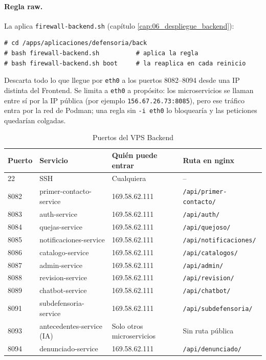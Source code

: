 
\paragraph{Regla raw.} La aplica \texttt{firewall-backend.sh} (capítulo \ref{cap:06_despliegue_backend}):
\begin{lstlisting}
# cd /apps/aplicaciones/defensoria/back
# bash firewall-backend.sh          # aplica la regla
# bash firewall-backend.sh boot     # la reaplica en cada reinicio
\end{lstlisting}
Descarta todo lo que llegue por \texttt{eth0} a los puertos 8082--8094 desde una IP distinta del Frontend. Se limita a \texttt{eth0} a propósito: los microservicios se llaman entre sí por la IP pública (por ejemplo \texttt{156.67.26.73:8085}), pero ese tráfico entra por la red de Podman; una regla sin \texttt{-i eth0} lo bloquearía y las peticiones quedarían colgadas.

\begin{table}[H]
\centering
\caption{Puertos del VPS Backend}
\small
\begin{tabular}{p{1.4cm}p{4.2cm}p{3.2cm}p{5.4cm}}
\toprule
\textbf{Puerto} & \textbf{Servicio} & \textbf{Quién puede entrar} & \textbf{Ruta en nginx} \\
\midrule
22 & SSH & Cualquiera & -- \\
8082 & primer-contacto-service & 169.58.62.111 & \texttt{/api/primer-contacto/} \\
8083 & auth-service & 169.58.62.111 & \texttt{/api/auth/} \\
8084 & quejas-service & 169.58.62.111 & \texttt{/api/quejoso/} \\
8085 & notificaciones-service & 169.58.62.111 & \texttt{/api/notificaciones/} \\
8086 & catalogo-service & 169.58.62.111 & \texttt{/api/catalogos/} \\
8087 & admin-service & 169.58.62.111 & \texttt{/api/admin/} \\
8088 & revision-service & 169.58.62.111 & \texttt{/api/revision/} \\
8089 & chatbot-service & 169.58.62.111 & \texttt{/api/chatbot/} \\
8091 & subdefensoria-service & 169.58.62.111 & \texttt{/api/subdefensoria/} \\
8093 & antecedentes-service (IA) & Solo otros microservicios & Sin ruta pública \\
8094 & denunciado-service & 169.58.62.111 & \texttt{/api/denunciado/} \\
\bottomrule
\end{tabular}
\end{table}

